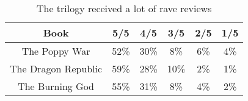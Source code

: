 \begin{table}[htbp]
\centering
\begin{tabular}{||c c c c c c||}
\hline 
Book & 5/5 & 4/5 & 3/5 & 2/5 & 1/5 \\ [0.5ex]
\hline\hline
The Poppy War & 52\% & 30\% & 8\% & 6\% &4\% \\
\hline
The Dragon Republic & 59\% & 28\% & 10\% & 2\% & 1\% \\
\hline
The Burning God & 55\% & 31\% & 8\% & 4\% & 2\% \\
\hline
\end{tabular}
\label{tab:trilogy_ratings}
\caption{The trilogy received a lot of rave reviews}
\end{table}
